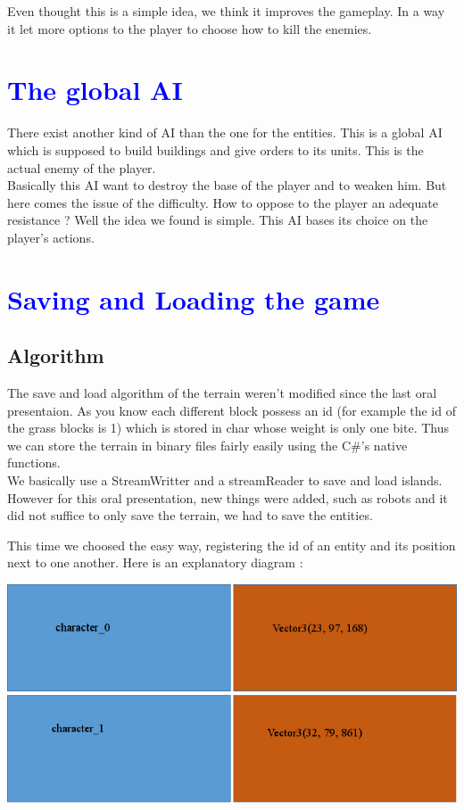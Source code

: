 \documentclass[article]{report}             %
\begin{document}
Even thought this is a simple idea, we think it improves the gameplay. In a way it let more options to the player to choose how to kill the enemies.
		\chapter{\textcolor{blue}{The global AI}}
			There exist another kind of AI than the one for the entities. This is a global AI which is supposed to build buildings and give orders to its units. This is the actual enemy of the player.\\

Basically this AI want to destroy the base of the player and to weaken him. But here comes the issue of the difficulty. How to oppose to the player an adequate resistance ? Well the idea we found is simple. This AI bases its choice on the player's actions. 
		\chapter{\textcolor{blue}{Saving and Loading the game}}
			\section{Algorithm}
				The save and load algorithm of the terrain weren't modified since the last oral presentaion. As you know each different block possess an id (for example the id of the grass blocks is  1) which is stored in char whose weight is only one bite. Thus we can store the terrain in binary files fairly easily using the C\#'s native functions.\\
					
					We basically use a StreamWritter and a streamReader to save and load islands. However for this oral presentation, new things were added, such as robots and it did not suffice to only save the terrain, we had to save the entities.
					
					This time we choosed the easy way, registering the id of an entity and its position next to one another. Here is an explanatory diagram :\\						
							\begin{center}
								\includegraphics{images/Save.png}
							\end{center}
							
\end{document}
